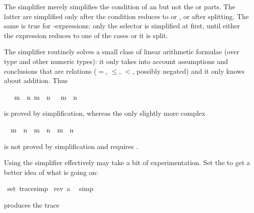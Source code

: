\begin{isabellebody}
\begin{isamarkuptxt}
\begin{warn}
  The simplifier merely simplifies the condition of an  but not the
   or  parts. The latter are simplified only after the
  condition reduces to  or , or after splitting. The
  same is true for -expressions: only the selector is
  simplified at first, until either the expression reduces to one of the
  cases or it is split.
\end{warn}%
\end{isamarkuptxt}%
%
%
\begin{isamarkuptext}%
The simplifier routinely solves a small class of linear arithmetic formulae
(over type  and other numeric types): it only takes into account
assumptions and conclusions that are relations
($=$, $\le$, $<$, possibly negated) and it only knows about addition. Thus%
\end{isamarkuptext}%
\ {\isachardoublequote}{\isasymlbrakk}\ {\isasymnot}\ m\ {\isacharless}\ n{\isacharsemicolon}\ m\ {\isacharless}\ n{\isacharplus}{}\ {\isasymrbrakk}\ {\isasymLongrightarrow}\ m\ {\isacharequal}\ n{\isachardoublequote}%
\begin{isamarkuptext}%
\noindent
is proved by simplification, whereas the only slightly more complex%
\end{isamarkuptext}%
\ {\isachardoublequote}{\isasymnot}\ m\ {\isacharless}\ n\ {\isasymand}\ m\ {\isacharless}\ n{\isacharplus}{}\ {\isasymLongrightarrow}\ m\ {\isacharequal}\ n{\isachardoublequote}%
\begin{isamarkuptext}%
\noindent
is not proved by simplification and requires .%
\end{isamarkuptext}%
%
%
\begin{isamarkuptext}%
Using the simplifier effectively may take a bit of experimentation.  Set the
  to get a better idea of what is going
on:%
\end{isamarkuptext}%
\ {\isachardoublequote}set\ trace{\isacharunderscore}simp{\isachardoublequote}\isanewline
{}\ {\isachardoublequote}rev\ {\isacharbrackleft}a{\isacharbrackright}\ {\isacharequal}\ {\isacharbrackleft}{\isacharbrackright}{\isachardoublequote}\isanewline
{}simp{\isacharparenright}%
\begin{isamarkuptext}%
\noindent
produces the trace


\end{isamarkuptext}
\end{isabellebody}
